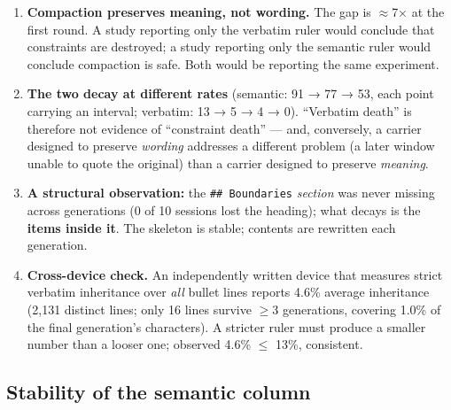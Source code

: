 \documentclass[
]{article}
\providecommand{\tightlist}{%
  \setlength{\itemsep}{0pt}\setlength{\parskip}{0pt}}
\begin{document}
\begin{enumerate}
\def\labelenumi{\arabic{enumi}.}
\tightlist
\item
  \textbf{Compaction preserves meaning, not wording.} The gap is
  \ensuremath{\approx}7× at the first round. A study reporting only the
  verbatim ruler would conclude that constraints are destroyed; a study
  reporting only the semantic ruler would conclude compaction is safe.
  Both would be reporting the same experiment.
\item
  \textbf{The two decay at different rates} (semantic: 91 → 77 → 53,
  each point carrying an interval; verbatim: 13 → 5 → 4 → 0). ``Verbatim
  death'' is therefore not evidence of ``constraint death'' --- and,
  conversely, a carrier designed to preserve \emph{wording} addresses a
  different problem (a later window unable to quote the original) than a
  carrier designed to preserve \emph{meaning}.
\item
  \textbf{A structural observation:} the \texttt{\#\#\ Boundaries}
  \emph{section} was never missing across generations (0 of 10 sessions
  lost the heading); what decays is the \textbf{items inside it}. The
  skeleton is stable; contents are rewritten each generation.
\item
  \textbf{Cross-device check.} An independently written device that
  measures strict verbatim inheritance over \emph{all} bullet lines
  reports 4.6\% average inheritance (2,131 distinct lines; only 16 lines
  survive \ensuremath{\geq}3 generations, covering 1.0\% of the final
  generation's characters). A stricter ruler must produce a smaller
  number than a looser one; observed 4.6\% \ensuremath{\leq} 13\%,
  consistent.
\end{enumerate}

\subsection{Stability of the semantic
column}\label{stability-of-the-semantic-column}
\end{document}
